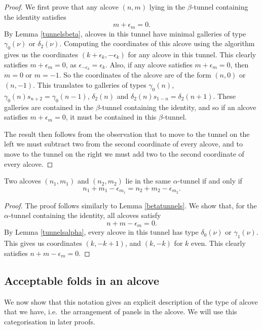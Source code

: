 \documentclass[11pt]{article}
\begin{document}
\begin{proof}
    We first prove that any alcove $(n,m)$ lying in the $\beta$-tunnel containing the identity satisfies 
    \[m+\epsilon_m=0.\]
    By Lemma \ref{tunnelsbeta}, alcoves in this tunnel have minimal galleries of type $\gamma_0(\nu)$ or $\delta_2(\nu)$. Computing the coordinates of this alcove using the algorithm gives us the coordinates $(k+\epsilon_k,-\epsilon_k)$ for any alcove in this tunnel. This clearly satisfies $m+\epsilon_m=0$, as $\epsilon_{-\epsilon_k}=\epsilon_k$. Also, if any alcove satisfies $m+\epsilon_m=0$, then $m=0$ or $m=-1$. So the coordinates of the alcove are of the form $(n,0)$ or $(n,-1)$. This translates to galleries of types $\gamma_0(n)$, $\gamma_0(n)s_{n+2}=\gamma_0(n-1)$, $\delta_2(n)$ and $\delta_2(n)s_{1-n}=\delta_2(n+1)$. These galleries are contained in the $\beta$-tunnel containing the identity, and so if an alcove satisfies $m+\epsilon_m=0$, it must be contained in this $\beta$-tunnel. 
    
    The result then follows from the observation that to move to the tunnel on the left we must subtract two from the second coordinate of every alcove, and to move to the tunnel on the right we must add two to the second coordinate of every alcove.
\end{proof}

\begin{lemma}
    Two alcoves $(n_1,m_1)$ and $(n_2,m_2)$ lie in the same $\alpha$-tunnel if and only if 
    \[n_1+m_1-\epsilon_{m_1}=n_2+m_2-\epsilon_{m_2}.\]
\end{lemma}

\begin{proof}
    The proof follows similarly to Lemma \ref{betatunnels}. We show that, for the $\alpha$-tunnel containing the identity, all alcoves satisfy
    \[n+m-\epsilon_{m}=0.\]
    By Lemma \ref{tunnelsalpha}, every alcove in this tunnel has type $\delta_0(\nu)$ or $\gamma_1(\nu)$. This gives us coordinates $(k,-k+1)$, and $(k,-k)$ for $k$ even. This clearly satisfies $n+m-\epsilon_{m}=0$. 
\end{proof}




\subsection{Acceptable folds in an alcove}

We now show that this notation gives an explicit description of the type of alcove that we have, i.e.\ the arrangement of panels in the alcove. We will use this categorisation in later proofs. 
\end{document}
